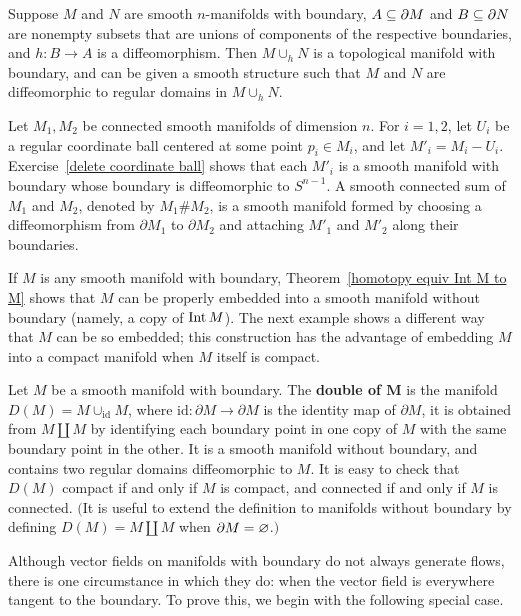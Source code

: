 \begin{corollary}
Suppose $M$ and $N$ are smooth $n$-manifolds with boundary, $A\subseteq\partial M$ and $B\subseteq\partial N$ are nonempty subsets that are unions of components of the respective boundaries, and $h:B\to A$ is a diffeomorphism. Then $M\cup_hN$ is a topological manifold with boundary, and can be given a smooth structure such that $M$ and $N$ are diffeomorphic to regular domains in $M\cup_hN$.
\end{corollary}
\begin{example}
Let $M_1,M_2$ be connected smooth manifolds of dimension $n$. For $i=1,2$, let $U_i$ be a regular coordinate ball centered at some point $p_i\in M_i$, and let $M'_i=M_i-U_i$. Exercise~\ref{delete coordinate ball} shows that each $M'_i$ is a smooth manifold with boundary whose boundary is diffeomorphic to $S^{n-1}$. A smooth connected sum of $M_1$ and $M_2$, denoted by $M_1\#M_2$, is a smooth manifold formed by choosing a diffeomorphism from $\partial M_1$ to $\partial M_2$ and attaching $M'_1$ and $M'_2$ along their boundaries.
\end{example}
If $M$ is any smooth manifold with boundary, Theorem~\ref{homotopy equiv Int M to M} shows that $M$ can be properly embedded into a smooth manifold without boundary (namely, a copy of $\mathrm{Int}\, M$). The next example shows a different way that $M$ can be so embedded; this construction has the advantage of embedding $M$ into a compact manifold when $M$ itself is compact.
\begin{example}\label{double manifold boundary}
Let $M$ be a smooth manifold with boundary. The \textbf{double of $\bm{M}$} is the manifold $D(M)=M\cup_{\mathrm{id}}M$, where $\mathrm{id}:\partial M\to\partial M$ is the identity map of $\partial M$, it is obtained from $M\amalg M$ by identifying each boundary point in one copy of $M$ with the same boundary point in the other. It is a smooth manifold without boundary, and contains two regular domains diffeomorphic to $M$. It is easy to check that $D(M)$ compact if and only if $M$ is compact, and connected if and only if $M$ is connected. $($It is useful to extend the definition to manifolds without boundary by defining $D(M)=M\amalg M$ when $\partial M=\varnothing$.$)$
\end{example}
Although vector fields on manifolds with boundary do not always generate flows,
there is one circumstance in which they do: when the vector field is everywhere
tangent to the boundary. To prove this, we begin with the following special case.
